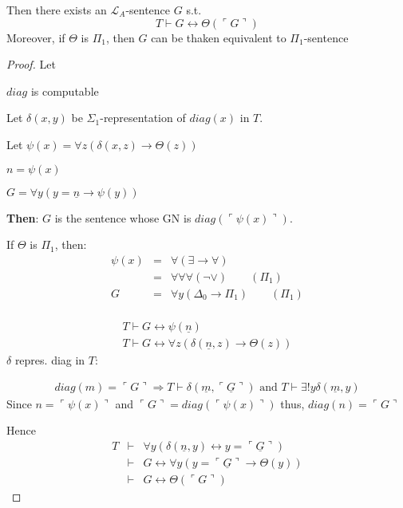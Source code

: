 \documentclass[12pt]{article}
\newcommand{\proves}{\vdash}
\newcommand{\gn}[1]{\ulcorner #1 \urcorner}
\begin{document}
Then there exists an $\mathcal{L}_A$-sentence $G$ s.t.
\[
T \proves G \leftrightarrow \Theta(\gn{G})
\]
Moreover, if $\Theta$ is $\Pi_1$, then $G$ can be thaken equivalent to $\Pi_1$-sentence
\begin{proof}
  Let 
  \iffalse %
  \[
  diag(n) =
  \begin{cases}
   \gn{\forall y ( y=n \rigtarrow \sigma(y))} %
   &\text{if $n = \gn{\sigma(x)}$ for some $\mathcal{L}_A$ formula $\sigma$} \\
   0 &\text{ o.w.}
  \end{cases}
  \]
  \fi
  $diag$ is computable

  Let $\delta(x,y)$ be $\Sigma_1$-representation of $diag(x)$ in $T$.

  Let $\psi(x) = \forall z \left( \delta(x,z) \rightarrow \Theta(z) \right)$

  $n = \psi(x)$

  $G = \forall y \left( y = \underline{n} \rightarrow \psi(y) \right)$ %

  \textbf{Then}: $G$ is the sentence whose GN is $diag(\gn{\psi(x)})$.

  If $\Theta$ is $\Pi_1$, then:
  \begin{align*}
    \psi(x) &=& \forall ( \exists \rightarrow \forall) \\
            &=& \forall \forall \forall (\neg \vee) \qquad (\Pi_1) \\
            G &=&  \forall y ( \Delta_0 \rightarrow \Pi_1) \qquad (\Pi_1) \\
  \end{align*}

\begin{align}
  T \proves G \leftrightarrow \psi(\underline{n}) \\
  \label{eq:star}
  T \proves G \leftrightarrow \forall z (\delta(\underline{n}, z) \rightarrow \Theta(z))
\end{align}
$\delta$ repres. diag in $T$:

\begin{align*}
  diag(m) = 
  \gn{G} \Rightarrow T \proves \delta(\underline{m}, \underline{\gn{G}})
  \text{ and } T \proves \exists !y \delta(\underline{m},y)
\end{align*}
Since $n = \gn{\psi(x)}$ and $\gn{G} = diag(\gn{\psi(x)})$
thus, $diag(n) = \gn{G}$

Hence 
\begin{align*}
  T &\proves& \forall y \left( \delta(\underline{n}, y) \leftrightarrow
  y = \underline{\gn{G}} \right) \\
  &\proves& G \leftrightarrow \forall y (y = \underline{\gn{G}} \rightarrow \Theta(y)) \\
  &\proves& G \leftrightarrow \Theta(\gn{G})
\end{align*}
\end{proof}
\end{document}
